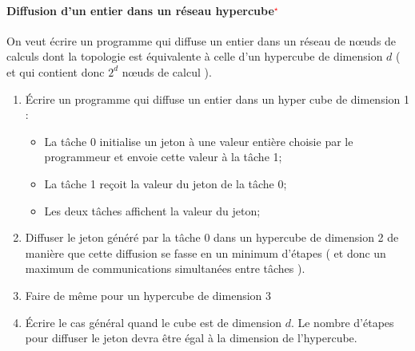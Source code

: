 \documentclass[11pt,a4paper]{article}
\begin{document}

\paragraph{Diffusion d'un entier dans un réseau hypercube\textcolor{red}{$^{\star}$}}

On veut écrire un programme qui diffuse un entier dans un réseau de n{\oe}uds de calculs dont la topologie
est équivalente à celle d'un hypercube de dimension $d$ ( et qui contient donc $2^{d}$ n{\oe}uds de calcul ).

\begin{enumerate}
\item \'Ecrire un programme qui diffuse un entier dans un hyper cube de dimension 1 :
\begin{itemize}
\item La tâche 0 initialise un jeton à une valeur entière choisie par le programmeur et envoie cette valeur 
à la tâche 1; 
\item La tâche 1 reçoit la valeur du jeton de la tâche 0;
\item Les deux tâches affichent la valeur du jeton;
\end{itemize}
\item Diffuser le jeton généré par la tâche 0 dans un hypercube de dimension 2 de manière que cette diffusion se fasse en un minimum
d'étapes ( et donc un maximum de communications simultanées entre tâches ).
\item Faire de même pour un hypercube de dimension 3
\item \'Ecrire le cas général quand le cube est de dimension $d$. Le nombre d'étapes pour diffuser le jeton devra
être égal à la dimension de l'hypercube.
\end{enumerate}
\end{document}
